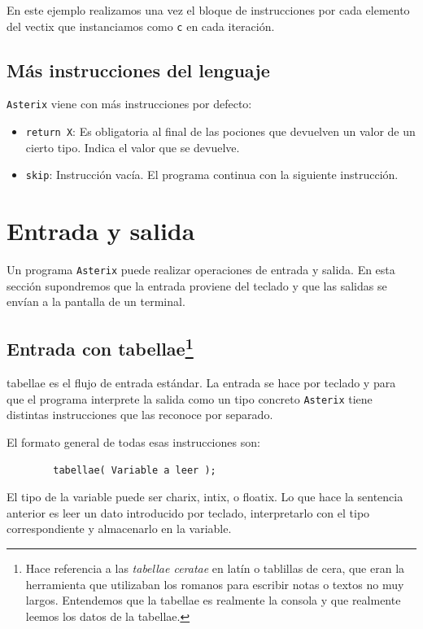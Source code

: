 \documentclass[a4paper, 10pt]{article}
\newcommand{\atx}{\texttt{Asterix} }
\begin{document}
    En este ejemplo realizamos una vez el bloque de instrucciones por cada
    elemento del vectix que instanciamos como \texttt{c} en cada iteración.
    
    \subsection*{Más instrucciones del lenguaje}
    \atx viene con más instrucciones por defecto:
    \begin{itemize}
        \item \texttt{return X}: Es obligatoria al final de las pociones que 
            devuelven un valor de un cierto tipo. Indica el valor que se devuelve.
        \item \texttt{skip}: Instrucción vacía. El programa continua con la
            siguiente instrucción.
    \end{itemize}  
    
    \section*{Entrada y salida}
    
    Un programa \atx puede realizar operaciones de entrada y salida. En esta
    sección supondremos que la entrada proviene del teclado y que las salidas
    se envían a la pantalla de un terminal.
    
    \subsection*{Entrada con tabellae\footnote{Hace referencia a las
    \textit{tabellae ceratae} en latín o tablillas de cera, que eran la
    herramienta que utilizaban los romanos para escribir notas o textos no muy
    largos. Entendemos que la tabellae es realmente la consola y que realmente
    leemos los datos de la tabellae.}}
    
    \textsf{tabellae} es el flujo de entrada estándar. La entrada se hace por
    teclado y para que el programa interprete la salida como un tipo concreto
    \atx tiene distintas instrucciones que las reconoce por separado.
    
    El formato general de todas esas instrucciones son:
    
    \begin{verbatim}
        tabellae( Variable a leer );
    \end{verbatim}
    
    El tipo de la variable  puede ser \textsf{charix}, \textsf{intix}, o
    \textsf{floatix}. Lo que hace la sentencia anterior es leer un dato
    introducido por teclado, interpretarlo con el tipo correspondiente y
    almacenarlo en la variable. 
\end{document}
